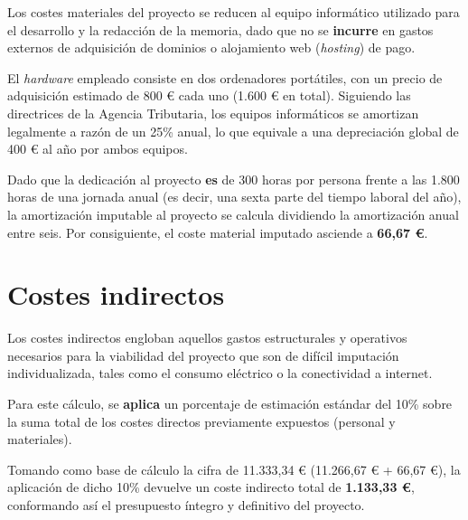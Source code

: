 Los costes materiales del proyecto se reducen al equipo informático utilizado para el desarrollo y la redacción de la memoria, dado que no se \textbf{incurre} en gastos externos de adquisición de dominios o alojamiento web (\textit{hosting}) de pago.

El \textit{hardware} empleado consiste en dos ordenadores portátiles, con un precio de adquisición estimado de 800 \euro{} cada uno (1.600 \euro{} en total). Siguiendo las directrices de la Agencia Tributaria, los equipos informáticos se amortizan legalmente a razón de un 25\% anual, lo que equivale a una depreciación global de 400 \euro{} al año por ambos equipos.

Dado que la dedicación al proyecto \textbf{es} de 300 horas por persona frente a las 1.800 horas de una jornada anual (es decir, una sexta parte del tiempo laboral del año), la amortización imputable al proyecto se calcula dividiendo la amortización anual entre seis. Por consiguiente, el coste material imputado asciende a \textbf{66,67 \euro}.

\section{Costes indirectos}

Los costes indirectos engloban aquellos gastos estructurales y operativos necesarios para la viabilidad del proyecto que son de difícil imputación individualizada, tales como el consumo eléctrico o la conectividad a internet. 

Para este cálculo, se \textbf{aplica} un porcentaje de estimación estándar del 10\% sobre la suma total de los costes directos previamente expuestos (personal y materiales). 

Tomando como base de cálculo la cifra de 11.333,34 \euro{} (11.266,67 \euro{} + 66,67 \euro), la aplicación de dicho 10\% devuelve un coste indirecto total de \textbf{1.133,33 \euro}, conformando así el presupuesto íntegro y definitivo del proyecto.